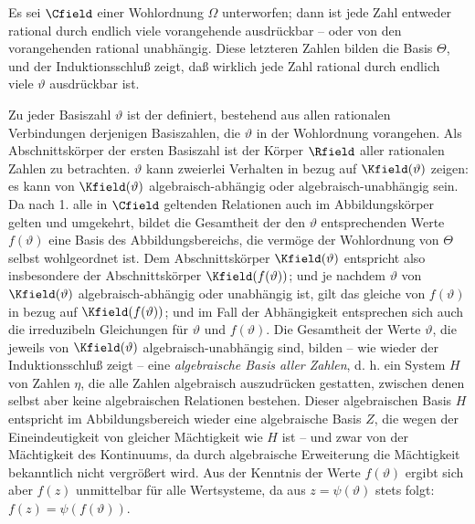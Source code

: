 Es sei \(\Cfield\) einer Wohlordnung \(\Omega\) unterworfen; dann ist jede Zahl entweder rational durch endlich viele vorangehende ausdrückbar -- oder von den vorangehenden rational unabhängig. Diese letzteren Zahlen bilden die Basis \(\Theta\), und der Induktionsschluß zeigt, daß wirklich jede Zahl rational durch endlich viele \(\vartheta\) ausdrückbar ist.

Zu jeder Basiszahl \(\vartheta\) ist der  definiert, bestehend aus allen rationalen Verbindungen derjenigen Basiszahlen, die \(\vartheta\) in der Wohlordnung vorangehen. Als Abschnittskörper der ersten Basiszahl ist der Körper \(\Rfield\) aller rationalen Zahlen zu betrachten. \(\vartheta\) kann zweierlei Verhalten in bezug auf \(\Kfield(\vartheta)\) zeigen: es kann von \(\Kfield(\vartheta)\) algebraisch-abhängig oder algebraisch-unabhängig sein. Da nach 1. alle in \(\Cfield\) geltenden Relationen auch im Abbildungskörper gelten und umgekehrt, bildet die Gesamtheit der den \(\vartheta\) entsprechenden Werte \(f(\vartheta)\) eine Basis des Abbildungsbereichs, die vermöge der Wohlordnung von \(\Theta\) selbst wohlgeordnet ist. Dem Abschnittskörper \(\Kfield(\vartheta)\) entspricht also insbesondere der Abschnittskörper \(\Kfield(f(\vartheta))\); und je nachdem \(\vartheta\) von \(\Kfield(\vartheta)\) algebraisch-abhängig oder unabhängig ist, gilt das gleiche von \(f(\vartheta)\) in bezug auf \(\Kfield(f(\vartheta))\); und im Fall der Abhängigkeit entsprechen sich auch die irreduzibeln Gleichungen für \(\vartheta\) und \(f(\vartheta)\). Die Gesamtheit der Werte \(\vartheta\), die jeweils von \(\Kfield(\vartheta)\) algebraisch-unabhängig sind, bilden -- wie wieder der Induktionsschluß zeigt -- eine \emph{algebraische Basis aller Zahlen}, d. h. ein System \(H\) von Zahlen \(\eta\), die alle Zahlen algebraisch auszudrücken gestatten, zwischen denen selbst aber keine algebraischen Relationen bestehen. Dieser algebraischen Basis \(H\) entspricht im Abbildungsbereich wieder eine algebraische Basis \(Z\), die wegen der Eineindeutigkeit von gleicher Mächtigkeit wie \(H\) ist -- und zwar von der Mächtigkeit des Kontinuums, da durch algebraische Erweiterung die Mächtigkeit bekanntlich nicht vergrößert wird. Aus der Kenntnis der Werte \(f(\vartheta)\) ergibt sich aber \(f(z)\) unmittelbar für alle Wertsysteme, da aus \(z=\psi(\vartheta)\) stets folgt: \(f(z)=\psi(f(\vartheta))\).

\medskip
